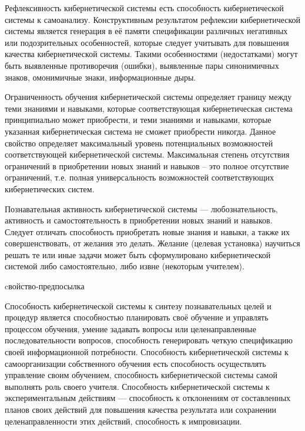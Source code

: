 Рефлексивность кибернетической системы есть способность кибернетической системы к самоанализу.
Конструктивным результатом рефлексии кибернетической системы является генерация в её памяти спецификации различных негативных или подозрительных особенностей, которые следует учитывать для повышения качества кибернетической системы.
Такими особенностями (недостатками) могут быть выявленные противоречия (ошибки), выявленные пары синонимичных знаков, омонимичные знаки, информационные дыры.

Ограниченность обучения кибернетической системы определяет границу между теми знаниями и навыками, которые соответствующая кибернетическая система принципиально может приобрести, и теми знаниями и навыками, которые указанная кибернетическая система не сможет приобрести никогда.
Данное свойство определяет максимальный уровень потенциальных возможностей соответствующей кибернетической системы.
Максимальная степень отсутствия ограничений в приобретении новых знаний и навыков – это полное отсутствие ограничений, т.е. полная универсальность возможностей соответствующих кибернетических систем.

Познавательная активность кибернетической системы --- любознательность, активность и самостоятельность в приобретении новых знаний и навыков.
Следует отличать способность приобретать новые знания и навыки, а также их совершенствовать, от желания это делать.
Желание (целевая установка) научиться решать те или иные задачи может быть сформулировано кибернетической системой либо самостоятельно, либо извне (некоторым учителем).

\begin{SCn}
\begin{scnrelfromlist}{cвойство-предпосылка}
\end{scnrelfromlist}
\end{SCn}

Способность кибернетической системы к синтезу познавательных целей и процедур является способностью планировать своё обучение и управлять процессом обучения, умение задавать вопросы или целенаправленные последовательности вопросов, способность генерировать четкую спецификацию своей информационной потребности.
Способность кибернетической системы к самоорганизации собственного обучения есть способность осуществлять управление своим обучением, способность кибернетической системы самой выполнять роль своего учителя.
Способность кибернетической системы к экспериментальным действиям --- способность к отклонениям от составленных планов своих действий для повышения качества результата или сохранении целенаправленности этих действий, способность к импровизации.

